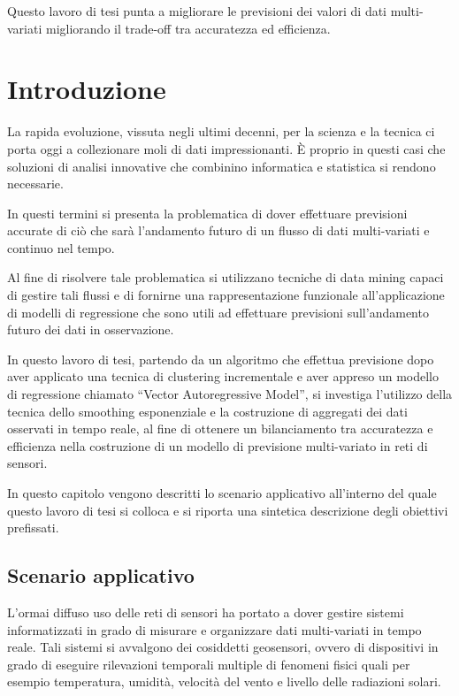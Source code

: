 \documentclass[12pt,a4paper,oneside,openright]{book}
\newcommand{\fncyblank}{\fancyhf{}}
\newenvironment{abstract}%
{\cleardoublepage\fncyblank\null \vfill\begin{center}%
\bfseries \abstractname \end{center}}%
{\vfill\null}
\begin{document}
\begin{abstract}
\begin{center}
Questo lavoro di tesi punta a migliorare le previsioni dei valori di dati multi-variati migliorando il trade-off tra accuratezza ed efficienza. 
\end{center}
\end{abstract}

\tableofcontents
\listoftables
\listoffigures

\chapter{Introduzione}
La rapida evoluzione, vissuta negli ultimi decenni, per la scienza e la tecnica ci porta oggi  a collezionare moli di dati impressionanti. È proprio in questi casi che soluzioni di analisi innovative che combinino informatica e statistica si rendono necessarie. 

In questi termini si presenta la problematica di dover effettuare previsioni accurate di ciò che sarà l’andamento futuro di un flusso di dati multi-variati e continuo nel tempo.

Al fine di risolvere tale problematica si utilizzano tecniche di data mining capaci di gestire tali flussi e di fornirne una rappresentazione funzionale all’applicazione di modelli di regressione che sono utili ad effettuare previsioni sull’andamento futuro dei dati in osservazione. 

In questo lavoro di tesi, partendo da un algoritmo che effettua previsione dopo aver applicato una tecnica di clustering incrementale e aver appreso un modello di regressione chiamato “Vector Autoregressive Model”, si investiga l’utilizzo della tecnica dello smoothing esponenziale e la costruzione di aggregati dei dati osservati in tempo reale, al fine di ottenere un bilanciamento tra accuratezza e efficienza nella costruzione di un modello di previsione multi-variato in reti di sensori.



In questo capitolo vengono descritti lo scenario applicativo all’interno del quale questo lavoro di tesi si colloca e si riporta una sintetica descrizione degli obiettivi prefissati. 
\newpage
\section{Scenario applicativo}
L’ormai diffuso uso delle reti di sensori ha portato a dover gestire sistemi informatizzati in grado di misurare e organizzare dati multi-variati in tempo reale. Tali sistemi si avvalgono dei cosiddetti geosensori, ovvero di dispositivi in grado di eseguire rilevazioni temporali multiple di fenomeni fisici quali per esempio temperatura, umidità, velocità del vento e livello delle radiazioni solari. 
\end{document}
